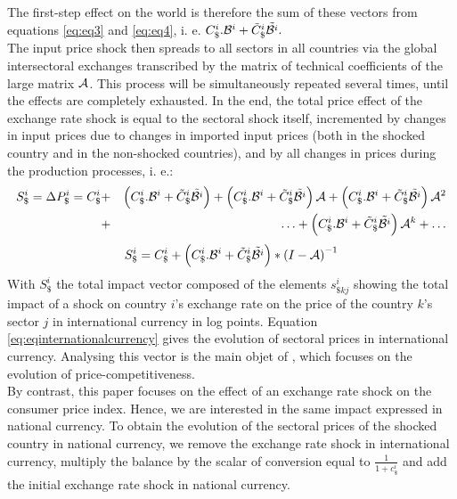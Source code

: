 \documentclass[11pt,a4paper]{article}
\begin{document}
The first-step effect on the world is therefore the sum of these vectors from equations  \ref{eq:eq3} and \ref{eq:eq4}, i. e. $C_\$^i.{\cal B}^i+{\tilde{C}_\$^i}{\tilde{{\cal B}^i}}.~$\\
The input price shock then spreads to all sectors in all countries via the global intersectoral exchanges transcribed by the matrix of technical coefficients of the large matrix $\cal {A}$. This process will be simultaneously repeated several times, until the effects are completely exhausted.
In the end, the total price effect of the exchange rate shock is equal to the sectoral shock itself, incremented by changes in input prices due to changes in imported input prices (both in the shocked country and in the non-shocked countries), and by all changes in prices during the production processes, i. e.:\\
\begin{eqnarray*}
S_\$^i = \Delta{{P}_{\$}^i}=C_\$^i&+& \left(C_\$^i.{\cal B}^i+{\tilde{C}_\$^i}{\tilde{{\cal B}^ i}}\right)+ \left(C_\$^i.{\cal B}^i+{\tilde{C}_\$^i}{\tilde{{\cal B}^i}}\right){{\cal A}}+\left(C_\$^i.{\cal B}^i+{\tilde{C}_\$^i}{\tilde{{\cal B}^i}}\right){{\cal A}^{2}} \\
&+&\ldots+\left(C_\$^i.{\cal B}^i+{\tilde{C}_\$^i}{\tilde{{\cal B}^i}}\right){\cal A}^k +\ldots \\
\end{eqnarray*}
 \begin{eqnarray}
S_\$^i=C_\$^i+\left(C_\$^i.{\cal B}^i+{\tilde{C}_\$^i}{\tilde{{\cal B}^i}}\right)*{{(I-{\cal A})}^{-1}}	
\label{eq:eqinternationalcurrency}
 \end{eqnarray}
With $S_\$^i$ the total impact vector composed of the elements ${{{s}}^i_{\$kj}}$ showing the total impact of a shock on country $i$'s exchange rate on the price of the country $k$'s sector $j$ in international currency in log points. 
Equation \ref{eq:eqinternationalcurrency} gives the evolution of sectoral prices in international currency. Analysing this vector is the main objet of \cite{Cochard2016}, which focuses on the evolution of price-competitiveness.\\
By contrast, this paper focuses on the effect of an exchange rate shock on the consumer price index. Hence, we are interested in the same impact expressed in national currency. To obtain the evolution of the sectoral prices of the shocked country in national currency, we remove the exchange rate shock in international currency, multiply the balance by the scalar of conversion equal to $\frac{1}{1+c_\$^i}$ and add the initial exchange rate shock in national currency.
\end{document}
